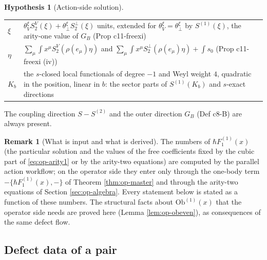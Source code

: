 \documentclass[11pt]{article}
\numberwithin{equation}{section}
\theoremstyle{plain}
\theoremstyle{definition}
\newtheorem{hypothesis}[theorem]{Hypothesis}
\newtheorem{remark}[theorem]{Remark}
\begin{document}
\begin{hypothesis}[Action-side solution]
\begin{center}
\begin{tabular}{l|p{11.2cm}}
$\xi$ & $\theta^\xi_V S^V_2(\xi)+\theta^\xi_\perp S^\perp_2(\xi)$ units, extended for $\theta^\xi_V=\theta^\xi_\perp$ by $S^{(1)}(\xi)$, the arity-one value of $G_B$ (Prop c11-freexi)\\
$\eta$ & $\sum_\mu\int x^\mu S^V_2(\rho(e_\mu)\eta)$ and $\sum_\mu\int x^\mu S^\perp_2(\rho(e_\mu)\eta)+\int s_0$ (Prop c11-freexi (iv))\\
$K_b$ & the $s$-closed local functionals of degree $-1$ and Weyl weight $4$, quadratic in the position, linear in $b$: the sector parts of $S^{(1)}(K_b)$ and $s$-exact directions
\end{tabular}
\end{center}
The coupling direction $S-S^{(2)}$ and the outer direction $G_B$ (Def c8-B) are always present.
\end{hypothesis}

\begin{remark}[What is input and what is derived]
\label{rem:op-input}
The numbers of $\hbar F_1^{(1)}(x)$ (the particular solution and the values of the free coefficients fixed by the cubic part of \eqref{eq:op-arity1} or by the arity-two equations) are computed by the parallel action workflow; on the operator side they enter only through the one-body term $-\{\hbar F_1^{(1)}(x),-\}$ of Theorem \ref{thm:op-master} and through the arity-two equations of Section \ref{sec:op-algebra}. Every statement below is stated as a function of these numbers. The structural facts about $\mathrm{Ob}^{(1)}(x)$ that the operator side needs are proved here (Lemma \ref{lem:op-obeven}), as consequences of the same defect flow.
\end{remark}

\subsection{Defect data of a pair}
\end{document}
